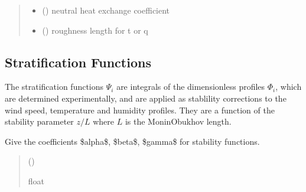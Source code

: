 \documentclass[letterpaper,10pt,english]{sphinxmanual}
\begin{document}
\begin{fulllineitems}
\begin{quote}
\begin{description}
\sphinxAtStartPar
\begin{itemize}
\item {} 
\sphinxAtStartPar
{} () \textendash{} neutral heat exchange coefficient

\item {} 
\sphinxAtStartPar
{} () \textendash{} roughness length for t or q

\end{itemize}


\end{description}\end{quote}

\end{fulllineitems}



\subsection{Stratification Functions}
\label{\detokenize{users_guide:stratification-functions}}
\sphinxAtStartPar
The stratification functions \(\Psi_i\) are integrals of the dimensionless profiles \(\Phi_i\), which are determined experimentally, and are applied as stablility corrections to the wind speed, temperature and humidity profiles.
They are a function of the stability parameter \(z/L\) where \(L\) is the Monin\sphinxhyphen{}Obukhov length.


\begin{fulllineitems}

\pysigstartsignatures
{}
\pysigstopsignatures
\sphinxAtStartPar
Give the coefficients \$alpha\$, \$beta\$, \$gamma\$ for stability functions.
\begin{quote}\begin{description}
\sphinxAtStartPar
{} () \textendash{} 

\sphinxAtStartPar
{}

\sphinxAtStartPar
float

\end{description}\end{quote}

\end{fulllineitems}
\end{document}

